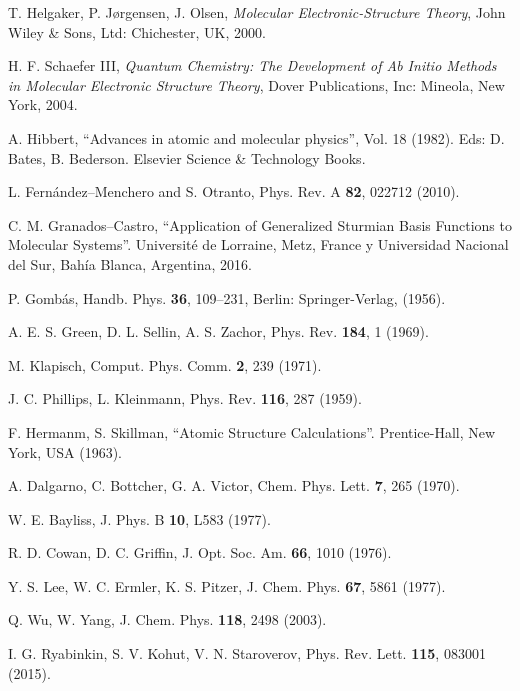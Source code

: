 \begin{thebibliography}{9}
T. Helgaker, P. J{\o}rgensen, J. Olsen,
\textit{Molecular Electronic-Structure Theory},
John Wiley {\&} Sons, Ltd: Chichester, UK, 2000.

H. F. Schaefer III,
\textit{Quantum Chemistry: The Development of Ab Initio Methods in
Molecular Electronic Structure Theory},
Dover Publications, Inc: Mineola, New York, 2004.


A. Hibbert,
``Advances in atomic and molecular physics'', Vol. 18 (1982).
Eds: D. Bates, B. Bederson. Elsevier Science \& Technology Books.

L. Fernández--Menchero and S. Otranto, 
Phys. Rev. A {\bf 82}, 022712 (2010).

C. M. Granados--Castro, 
``Application of Generalized Sturmian Basis Functions to
Molecular Systems''. 
Universit\'e de Lorraine, Metz, France y Universidad Nacional del Sur, Bah\'ia Blanca, Argentina, 2016.

P. Gombás, 
Handb. Phys. \textbf{36}, 109--231, Berlin: Springer-Verlag, (1956).

A. E. S. Green, D. L. Sellin, A. S. Zachor,
Phys. Rev. \textbf{184}, 1 (1969).

M. Klapisch,
Comput. Phys. Comm. \textbf{2}, 239 (1971).

J. C. Phillips, L. Kleinmann,
Phys. Rev. \textbf{116}, 287 (1959).

F. Hermanm, S. Skillman,
``Atomic Structure Calculations''. 
Prentice-Hall, New York, USA (1963).

A. Dalgarno, C. Bottcher, G. A. Victor, 
Chem. Phys. Lett. \textbf{7}, 265 (1970).

W. E. Bayliss,
J. Phys. B \textbf{10}, L583 (1977).

R. D. Cowan, D. C. Griffin, 
J. Opt. Soc. Am. \textbf{66}, 1010 (1976).

Y. S. Lee, W. C. Ermler, K. S. Pitzer, 
J. Chem. Phys. \textbf{67}, 5861 (1977).


Q. Wu, W. Yang,
J. Chem. Phys. \textbf{118}, 2498 (2003).

I. G. Ryabinkin, S. V. Kohut, V. N. Staroverov,
Phys. Rev. Lett. \textbf{115}, 083001 (2015).


\end{thebibliography}
